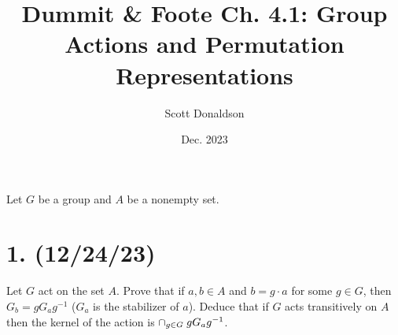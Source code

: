 \documentclass{article}
\title{Dummit \& Foote Ch. 4.1: Group Actions and Permutation Representations}
\author{Scott Donaldson}
\date{Dec. 2023}
\begin{document}
\maketitle

Let $G$ be a group and $A$ be a nonempty set.

\section*{1. (12/24/23)}

Let $G$ act on the set $A$. Prove that if $a, b \in A$ and $b = g \cdot a$ for some $g \in G$, then $G_b = gG_ag^{-1}$ ($G_a$ is the stabilizer of $a$). Deduce that if $G$ acts transitively on $A$ then the kernel of the action is $\cap_{g \in G}\hspace{0.25em}gG_ag^{-1}$.
\end{document}
